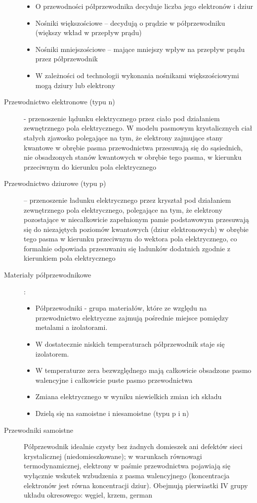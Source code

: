 \documentclass[a4paper,11pt]{article}
\begin{document}
\begin{description}
\begin{itemize}
  \item O przewodności półprzewodnika decyduje liczba jego elektronów i dziur
  \item Nośniki większościowe -- decydują o prądzie w półprzewodniku (większy wkład w przepływ prądu)
  \item Nośniki mniejszościowe -- mające mniejszy wpływ na przepływ prądu przez półprzewodnik
  \item W zależności od technologii wykonania nośnikami większościowymi mogą dziury lub elektrony
  \end{itemize}
\item[Przewodnictwo elektronowe (typu n)] - przenoszenie łądunku elektrycznego przez ciało pod działaniem zewnętrznego pola elektrycznego. W modelu pasmowym krystalicznych ciał stałych zjawosko polegające na tym, że elektrony zajmujące stany kwantowe w obrębie pasma przewodnictwa przesuwają się do sąsiednich, nie obsadzonych stanów kwantowych w obrębie tego pasma, w kierunku przeciwnym do kierunku pola elektrycznego
\item[Przewodnictwo dziurowe (typu p)] -- przenoszenie ładunku elektrycznego przez kryształ pod działaniem zewnętrznego pola elektrycznego, polegające na tym, że elektrony pozostające w niecałkowicie zapełnionym pamie podstawowym przesuwają się do niezajętych poziomów kwantowych (dziur elektronowych) w obrębie tego pasma w kierunku przeciwnym do wektora pola elektrycznego, co formalnie odpowiada przesuwaniu się ładunków dodatnich zgodnie z kierunkiem pola elektrycznego
\item[Materiały półprzewodnikowe]:
  \begin{itemize}
  \item Półprzewodniki - grupa materiałów, które ze względu na przewodnictwo elektryczne zajmują pośrednie miejsce pomiędzy metalami a izolatorami. 
  \item W dostatecznie niskich temperaturach półprzewodnik staje się izolatorem.
  \item W temperaturze zera bezwzględnego mają całkowicie obsadzone pasmo walencyjne i całkowicie puste pasmo przewodnictwa
  \item Zmiana elektrycznego w wyniku niewielkich zmian ich składu
  \item Dzielą się na samoistne i niesamoistne (typu p i n)
  \end{itemize}
\item[Przewodniki samoistne] Półprzewodnik idealnie czysty bez żadnych domieszek ani defektów sieci krystalicznej (niedomieszkowane); w warunkach równowagi termodynamicznej, elektrony w paśmie przewodnictwa pojawiają się wyłącznie wskutek wzbudzenia z pasma walencyjnego (koncentracja elektronów jest równa koncentracji dziur). Obejmują pierwiastki IV grupy układu okresowego: węgiel, krzem, german\\

\end{description}
\end{document}
